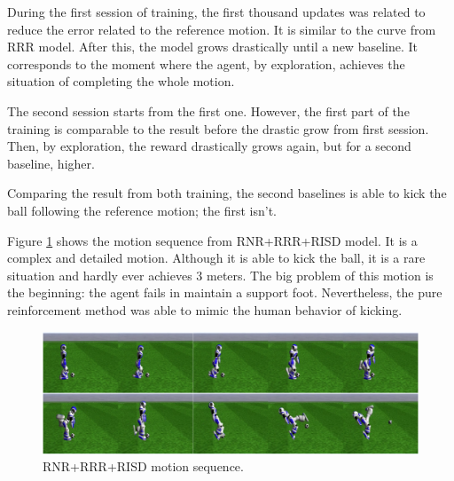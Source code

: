 During the first session of training, the first thousand updates was related to reduce the error related to the reference motion. It is similar to the curve from RRR model. After this, the model grows drastically until a new baseline. It corresponds to the moment where the agent, by exploration, achieves the situation of completing the whole motion.

The second session starts from the first one. However, the first part of the training is comparable to the result before the drastic grow from first session. Then, by exploration, the reward drastically grows again, but for a second baseline, higher.

Comparing the result from both training, the second baselines is able to kick the ball following the reference motion; the first isn't.

Figure \ref{fig:risdmotionsequence} shows the motion sequence from RNR+RRR+RISD model. It is a complex and detailed motion. Although it is able to kick the ball, it is a rare situation and hardly ever achieves 3 meters. The big problem of this motion is the beginning: the agent fails in maintain a support foot. Nevertheless, the pure reinforcement method was able to mimic the human behavior of kicking.

\begin{figure}[!htbp]
	\centering
	\includegraphics[width=1.0\textwidth]{Cap6/risdmotionsequence.eps}
	\caption{RNR+RRR+RISD motion sequence.}
	\label{fig:risdmotionsequence}
\end{figure}




